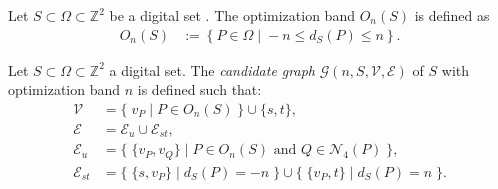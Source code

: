 \documentclass[review]{siamart220329}
\begin{document}
\begin{definition}
Let $S \subset \Omega \subset \mathbb{Z}^2$ be a digital set
. The optimization band
$O_n(S)$ is defined as
%
%
\begin{align*}
	O_n(S) &:=\left\{ P \in \Omega \; | \; -n \leq d_{S}(P) \leq n \right\}.
\end{align*}
\end{definition}
%
%
\begin{definition}
Let $S \subset \Omega \subset \mathbb{Z}^2$ a digital set. The {\em candidate graph} $\mathcal{G}(n,S,\mathcal{V},\mathcal{E})$ of $S$ with optimization band $n$ is defined such that:
%
%
\begin{align*}
\mathcal{V} &= \big\{\; v_P \; | \; P \in O_n(S) \;\} \cup \{s,t \big\}, \\
\mathcal{E} &= \mathcal{E}_u \cup \mathcal{E}_{st}, \\
\mathcal{E}_u &= \big\{ \; \{v_P,v_Q\} \; | \; P \in O_n(S) \text{ and } Q \in \mathcal{N}_4(P) \; \big\}, \\
\mathcal{E}_{st} &= \big\{\; \{s,v_P\} \; | \; d_S(P)=-n \; \big\} \cup \big\{\; \{v_P,t\} \; | \; d_S(P)=n \; \big\}.
\end{align*}
%
%
\end{definition}
\end{document}
